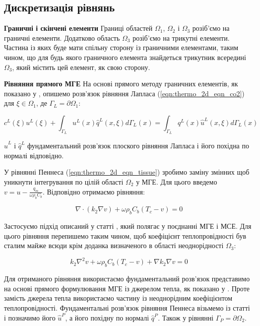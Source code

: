 \subsection{Дискретизація рівнянь}

\textbf{Граничні і скінчені елементи} Границі областей $\Omega_1$, $\Omega_2$ і $\Omega_3$ розіб'ємо на граничні 
елементи. Додатково область $\Omega_3$ розіб'ємо на трикутні елементи. Частина із яких буде мати спільну сторону із 
граничними елементами, таким чином, що для будь якого граничного елемента знайдеться трикутник всередині $\Omega_3$, 
який містить цей елемент, як свою сторону.

\textbf{Рівняння прямого МГЕ} На основі прямого методу граничних елементів, як показано у \cite{brebbia-bem}, опишемо 
розв'язок рівняння Лапласа (\ref{eqn:thermo_2d_eqn_co2}) для $\xi \in \Omega_1$, де $\Gamma_L = \partial\Omega_1$:

\begin{equation}
    \label{eqn:thermo_2d_bem_direct_laplace}
    c^L(\xi)u^L(\xi) + \int_{\Gamma_L}u^L(x)\hat{q}^L(x,\xi)d\Gamma_L(x) = 
        \int_{\Gamma_L}q^L(x)\hat{u}^L(x,\xi)d\Gamma_L(x)
\end{equation}

\noindent$\hat{u}^L$ і $\hat{q}^L$ фундаментальний розв'язок плоского рівняння Лапласа і його похідна по нормалі 
відповідно.

У рівнянні Пеннеса (\ref{eqn:thermo_2d_eqn_tissue}) зробимо заміну змінних щоб уникнути інтегрування по цілій області 
$\Omega_2$ у МГЕ. Для цього введемо $v = u - \frac{q_m}{\omega \rho_b C_b}$. Відповідно отримаємо рівняння:

\begin{equation*}
    \nabla \cdot (k_2\nabla{v}) + \omega \rho_b C_b (T_c - v) = 0
\end{equation*}

Застосуємо підхід описаний у статті \cite{personal-bem-thermo}, який полягає у поєднанні МГЕ і МСЕ. Для цього рівняння
перепишемо таким чином, щоб коефіцієнт теплопровідності був сталим майже всюди крім доданка визначеного в 
області неоднорідності $\Omega_3$:  

\begin{equation*}
    k_2\nabla^2{v} + \omega \rho_b C_b (T_c - v) + \nabla{k_2}\nabla{v} = 0
\end{equation*}

Для отриманого рівняння використаємо фундаментальний розв'язок представимо на основі прямого формулювання МГЕ із 
джерелом тепла, як показано у \cite{brebbia-bem}. Проте замість джерела тепла використаємо частину із неоднорідним 
коефіцієнтом теплопровідності. Фундаментальні розв'язок рівняння Пеннеса візьмемо із статті 
\cite{pennes-equation-bem-fundamental-solutions} і позначимо його $\hat{u}^P$, а його похідну по нормалі $\hat{q}^P$. 
Також у рівнянні $\Gamma_P = \partial \Omega_2$.

